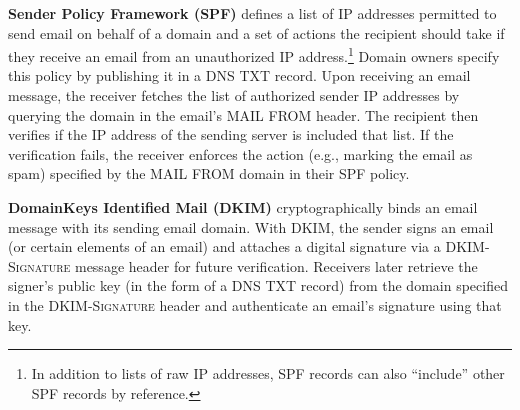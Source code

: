 \medskip
\noindent\textbf{Sender Policy Framework (SPF)} defines a list of IP addresses permitted to send email on behalf of a domain and a set of actions the recipient should take if they receive an email from an unauthorized IP address.\footnote{In addition to lists of raw IP addresses, SPF
records can also ``include'' other SPF records by reference.}
Domain owners specify this policy by publishing it in a DNS TXT record.
Upon receiving an email message, the receiver fetches the list of authorized sender IP addresses by querying the domain in the email's \textsc{MAIL FROM} header.
The recipient then verifies if the IP address of the sending server is included that list.
If the verification fails, the receiver enforces the action (e.g., marking the email as spam) specified by the \textsc{MAIL FROM} domain in their SPF policy.


%

\medskip
\noindent\textbf{DomainKeys Identified Mail (DKIM)} cryptographically
binds an email message with its sending email domain.  With DKIM, the
sender signs an email (or certain elements of an email) and attaches a digital signature via a
\textsc{DKIM-Signature} message header for future verification.
Receivers later retrieve the signer's public key (in the form of a DNS TXT record) from the domain specified in the \textsc{DKIM-Signature} header and authenticate an email's signature using that key.

